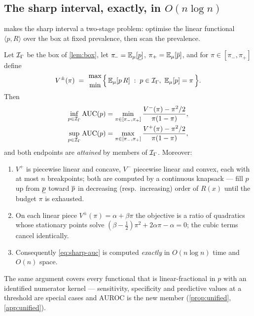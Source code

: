 \subsection{The sharp interval, exactly, in \texorpdfstring{$O(n\log n)$}{O(n log n)}}

 makes the sharp interval a two-stage problem:
optimise the linear functional $\langle p,R\rangle$ over the box at fixed
prevalence, then scan the prevalence.

\begin{theorem}
\label{thm:sharp-auc}
Let $\mathcal{I}_\Gamma$ be the box of \cref{lem:box}, let
$\pi_{\!-}=\mathbb{E}_\mu[\underline{p}]$, $\pi_{+}=\mathbb{E}_\mu[\overline{p}]$, and for
$\pi\in[\pi_-,\pi_+]$ define
\[
  V^{\pm}(\pi) \;=\; \genfrac{}{}{0pt}{}{\max}{\min}
  \Big\{\, \E_\mu[p\,R] \;:\; p\in\I_\Gamma,\ \E_\mu[p]=\pi \,\Big\}.
\]
Then
\begin{equation}
\begin{aligned}
  \inf_{p\in\mathcal{I}_\Gamma}\operatorname{AUC}(p) &= \min_{\pi\in[\pi_-,\pi_+]}\frac{V^{-}(\pi)-\pi^2/2}{\pi(1-\pi)},\\
  \sup_{p\in\mathcal{I}_\Gamma}\operatorname{AUC}(p) &= \max_{\pi\in[\pi_-,\pi_+]}\frac{V^{+}(\pi)-\pi^2/2}{\pi(1-\pi)},
\end{aligned}
  \label{eq:sharp-auc}
\end{equation}
and both endpoints are \emph{attained} by members of $\mathcal{I}_\Gamma$. Moreover:
\begin{enumerate}
\item[(i)] $V^{+}$ is piecewise linear and concave, $V^{-}$ piecewise linear and
  convex, each with at most $n$ breakpoints; both are computed by a continuous
  knapsack --- fill $p$ up from $\underline{p}$ toward $\overline{p}$ in decreasing (resp.\
  increasing) order of $R(x)$ until the budget $\pi$ is exhausted.
\item[(ii)] On each linear piece $V^\pm(\pi)=\alpha+\beta\pi$ the objective is a
  ratio of quadratics whose stationary points solve
  $(\beta-\tfrac12)\pi^{2} + 2\alpha\pi - \alpha = 0$; the cubic terms cancel
  identically.
\item[(iii)] Consequently \eqref{eq:sharp-auc} is computed \emph{exactly} in
  $O(n\log n)$ time and $O(n)$ space.
\end{enumerate}
\end{theorem}

The same argument covers every functional that is linear-fractional in
$p$ with an identified numerator kernel --- sensitivity, specificity and
predictive values at a threshold are special cases and AUROC is the new
member (\cref{prop:unified}, \cref{app:unified}).
